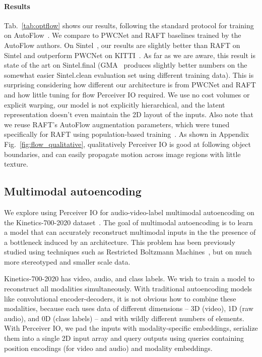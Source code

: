 \documentclass{article} \usepackage{iclr2022_conference,times}
\newcommand{\ourmodel}{Perceiver IO\xspace}
\begin{document}
\paragraph{Results} Tab.~\ref{tab:optflow} shows our results, following the standard protocol for training on AutoFlow~\citep{sun2021autoflow}. We compare to PWCNet and RAFT baselines trained by the AutoFlow authors.  On Sintel~\citep{butler2012naturalistic}, our results are slightly better than RAFT on Sintel and outperform PWCNet on KITTI~\citep{menze2015object}.  As far as we are aware, this result is state of the art on Sintel.final (GMA~\cite{jiang2021learning} produces slightly better numbers on the somewhat easier Sintel.clean evaluation set using different training data). This is surprising considering how different our architecture is from PWCNet and RAFT and how little tuning for flow \ourmodel{} required.  We use no cost volumes or explicit warping, our model is not explicitly hierarchical, and the latent representation doesn't even maintain the 2D layout of the inputs.  Also note that we reuse RAFT's AutoFlow augmentation parameters, which were tuned specifically for RAFT using population-based training~\citep{sun2021autoflow}.  As shown in Appendix Fig.~\ref{fig:flow_qualitative}, qualitatively \ourmodel{} is good at following object boundaries, and can easily propagate motion across image regions with little texture.  

\subsection{Multimodal autoencoding}
\label{sec:multimodal}
We explore using \ourmodel{} for audio-video-label multimodal autoencoding on the Kinetics-700-2020 dataset~\citep{smaira2020short}. The goal of multimodal autoencoding is to learn a model that can accurately reconstruct multimodal inputs in the the presence of a bottleneck induced by an architecture. This problem has been previously studied using techniques such as Restricted Boltzmann Machines~\citep{ngiam2011multimodal}, but on much more stereotyped and smaller scale data.

Kinetics-700-2020 has video, audio, and class labels. We wish to train a model to reconstruct all modalities simultaneously. With traditional autoencoding models like convolutional encoder-decoders, it is not obvious how to combine these modalities, because each uses data of different dimensions -- 3D (video), 1D (raw audio), and 0D (class labels) -- and with wildly different numbers of elements. With \ourmodel{}, we pad the inputs with modality-specific embeddings, serialize them into a single 2D input array and query outputs using queries containing position encodings (for video and audio) and modality embeddings.
\end{document}
